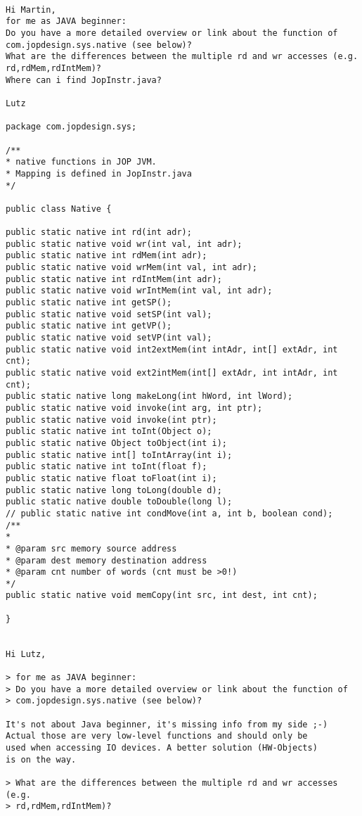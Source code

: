 \documentclass[a4paper,12pt]{scrartcl}
\begin{document}
\begin{verbatim}

Hi Martin,
for me as JAVA beginner:
Do you have a more detailed overview or link about the function of
com.jopdesign.sys.native (see below)?
What are the differences between the multiple rd and wr accesses (e.g.
rd,rdMem,rdIntMem)?
Where can i find JopInstr.java?

Lutz

package com.jopdesign.sys;

/**
* native functions in JOP JVM.
* Mapping is defined in JopInstr.java
*/

public class Native {

public static native int rd(int adr);
public static native void wr(int val, int adr);
public static native int rdMem(int adr);
public static native void wrMem(int val, int adr);
public static native int rdIntMem(int adr);
public static native void wrIntMem(int val, int adr);
public static native int getSP();
public static native void setSP(int val);
public static native int getVP();
public static native void setVP(int val);
public static native void int2extMem(int intAdr, int[] extAdr, int cnt);
public static native void ext2intMem(int[] extAdr, int intAdr, int cnt);
public static native long makeLong(int hWord, int lWord);
public static native void invoke(int arg, int ptr);
public static native void invoke(int ptr);
public static native int toInt(Object o);
public static native Object toObject(int i);
public static native int[] toIntArray(int i);
public static native int toInt(float f);
public static native float toFloat(int i);
public static native long toLong(double d);
public static native double toDouble(long l);
// public static native int condMove(int a, int b, boolean cond);
/**
*
* @param src memory source address
* @param dest memory destination address
* @param cnt number of words (cnt must be >0!)
*/
public static native void memCopy(int src, int dest, int cnt);

}


Hi Lutz,

> for me as JAVA beginner:
> Do you have a more detailed overview or link about the function of
> com.jopdesign.sys.native (see below)?

It's not about Java beginner, it's missing info from my side ;-)
Actual those are very low-level functions and should only be
used when accessing IO devices. A better solution (HW-Objects)
is on the way.

> What are the differences between the multiple rd and wr accesses (e.g.
> rd,rdMem,rdIntMem)?


\end{verbatim}
\end{document}
